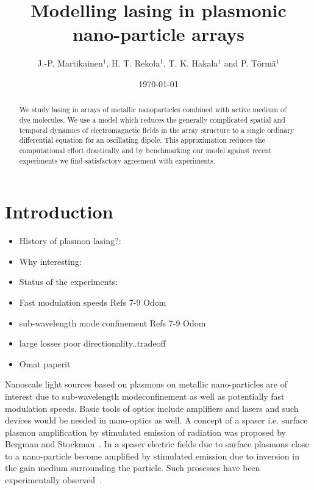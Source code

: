 \documentclass{iopart}
\begin{document}
\title{Modelling lasing in plasmonic nano-particle arrays}
\author{J.-P. Martikainen$^1$, H. T. Rekola$^1$, T. K. Hakala$^1$ and P. T\"{o}rm\"{a}$^1$}
\address{$^1$ COMP Centre of Excellence, Department of Applied Physics,Aalto University, P.O. Box 15100, Fi-00076 Aalto, Finland}


\date{\today}

\begin{abstract}
We study lasing in 
arrays of metallic nanoparticles combined with active medium of dye molecules. We use a model which reduces the generally complicated spatial
and temporal dynamics of electromagnetic fields in the array structure
to a single ordinary differential equation for an oscillating dipole.
This approximation reduces the computational effort drastically and by
benchmarking our model against recent experiments we find satisfactory
agreement with experiments.
\end{abstract}
\maketitle 


\section{Introduction}

\begin{itemize}
\item History of plasmon lasing?:
\item Why interesting:
\item Status of the experiments: 
\item Fast modulation speeds Refs 7-9 Odom
\item sub-wavelength mode confinement Refs 7-9 Odom
\item large losses poor directionality..tradeoff
\item Omat paperit ~\cite{martikainen_condensation_2014,shi_spatial_2014,vakevainen_plasmonic_2014}
\end{itemize}

Nanoscale light sources based on plasmons on metallic nano-particles
are of interest due to sub-wavelength modeconfinement as well as potentially fast modulation speeds. Basic tools of optics include amplifiers and lasers and such  devices would be needed in nano-optics as well.
A concept of a spaser i.e. surface plasmon amplification by stimulated emission of radiation was proposed by Bergman and Stockman~\cite{bergman_surface_2003}.
In a spaser electric fields due to surface plasmons close to a nano-particle
become amplified by stimulated emission due to inversion in the gain medium
surrounding the particle. Such prosesses have been experimentally 
observed~\cite{noginov_demonstration_2009,oulton_plasmon_2009}.
\end{document}

